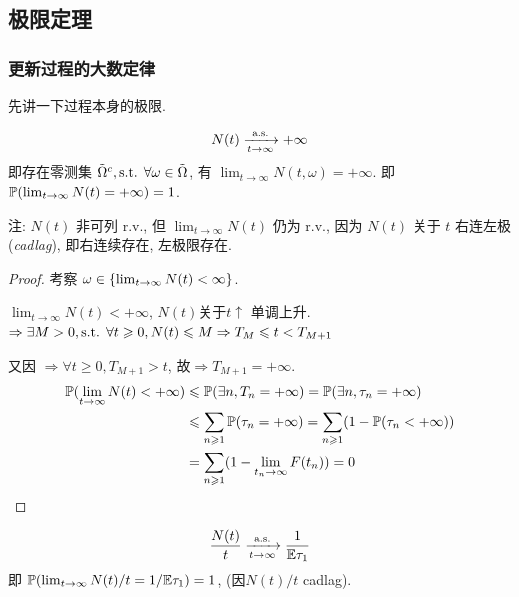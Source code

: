 \subsection{极限定理}
\subsubsection{更新过程的大数定律}

先讲一下过程本身的极限.
\begin{lemma}\label{lem:p114-lem2}
    \[
    N(t)\xrightarrow[t\to\infty]{\text{a.s.}} +\infty
    \]
    即存在零测集 $\tilde{\Omega}^c,\text{s.t. } \forall \omega \in \tilde{\Omega}$, 有 $\lim_{t\to\infty}N(t,\omega)=+\infty$. 即 $\mathbb{P}(\lim_{t\to\infty}N(t)=+\infty)=1$.

    注: $N(t)$ 非可列 r.v., 但 $\lim_{t\to\infty}N(t)$ 仍为 r.v., 因为 $N(t)$ 关于 $t$ 右连左极 (\textit{cadlag}), 即右连续存在, 左极限存在.
\end{lemma}

\begin{proof}
考察 $\omega\in\{\lim_{t \to \infty}N(t)<\infty\}$.

$\lim_{t\to\infty}N(t)<+\infty$, $N(t)$关于$t\uparrow$ 单调上升. $\Rightarrow \exists M>0,\text{s.t. } \forall t\geqslant 0, N(t)\leqslant M\Rightarrow T_M\leqslant t< T_{M+1}$

又因 $\Rightarrow \forall t\geq 0,T_{M+1}>t$, 故$\Rightarrow T_{M+1}=+\infty$.
    \[
    \begin{aligned}
        \mathbb{P}(\lim_{t \to \infty}N(t)<+\infty)&\leqslant \mathbb{P}(\exists n,T_n=+\infty)=\mathbb{P}(\exists n,\tau_n=+\infty)\\
        &\leqslant \sum_{n\geqslant 1}\mathbb{P}(\tau_n=+\infty)=\sum_{n\geqslant 1}(1-\mathbb{P}(\tau_n<+\infty))\\
        &=\sum_{n\geqslant 1}(1-\lim_{t_n \to \infty}F(t_n))=0
    \end{aligned}
    \]
\end{proof}

\begin{theorem}[更新过程的LLN]\label{thm:p114-thm3.1}
    \[
    \frac{N(t)}{t}\xrightarrow[t\to\infty]{\text{a.s.}}\frac{1}{\mathbb E\tau_1}
    \]
    即 $\mathbb{P}(\lim_{t \to \infty}N(t)/t=1/\mathbb E\tau_1)=1$, (因$N(t)/t$ cadlag). 
\end{theorem}

